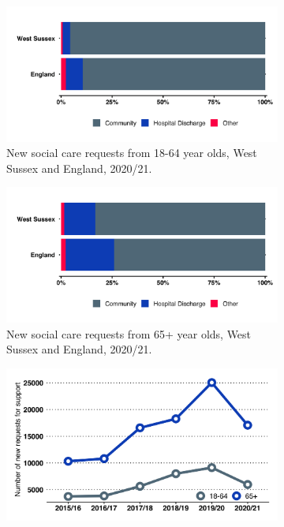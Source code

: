 \begin{figure}
    \caption{New requests for social care in West Sussex.}\label{fig:sc-requests}
    \vspace*{5mm}
    \centering
    \begin{subfigure}[b]{0.49\textwidth}
        \centering
        \includegraphics[width=\textwidth]{images/new_sc_requests_18_to_64.png}
        \caption{New social care requests from 18-64 year olds, West Sussex and England, 2020/21.}
        \label{fig:sc:new_requests_18_64}
    \end{subfigure}
    \begin{subfigure}[b]{0.49\textwidth}
        \centering
        \includegraphics[width=\textwidth]{images/new_sc_requests_65_plus.png}
        \caption{New social care requests from 65+ year olds, West Sussex and England, 2020/21.}
        \label{fig:sc:new_requests_65_plus}
    \end{subfigure}
    \begin{subfigure}[b]{0.49\textwidth}
        \centering
        \includegraphics[width=\textwidth]{images/new_sc_requests_line.png}

\end{subfigure}
\end{figure}
